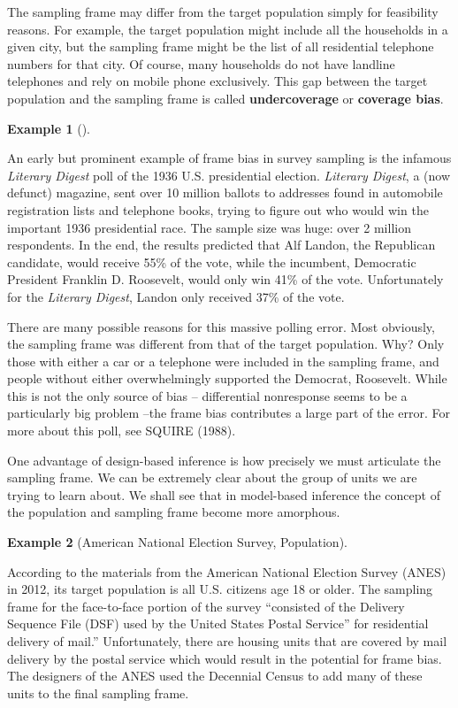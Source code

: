 \documentclass[
  letterpaper,
  DIV=11,
  numbers=noendperiod]{scrreprt}
\theoremstyle{plain}
\theoremstyle{definition}
\newtheorem{example}{Example}[chapter]
\theoremstyle{definition}
\theoremstyle{remark}
\begin{document}
The sampling frame may differ from the target population simply for
feasibility reasons. For example, the target population might include
all the households in a given city, but the sampling frame might be the
list of all residential telephone numbers for that city. Of course, many
households do not have landline telephones and rely on mobile phone
exclusively. This gap between the target population and the sampling
frame is called \textbf{undercoverage} or \textbf{coverage bias}.

\begin{example}[]\protect\hypertarget{exm-frame-bias}{}\label{exm-frame-bias}

An early but prominent example of frame bias in survey sampling is the
infamous \emph{Literary Digest} poll of the 1936 U.S. presidential
election. \emph{Literary Digest}, a (now defunct) magazine, sent over 10
million ballots to addresses found in automobile registration lists and
telephone books, trying to figure out who would win the important 1936
presidential race. The sample size was huge: over 2 million respondents.
In the end, the results predicted that Alf Landon, the Republican
candidate, would receive 55\% of the vote, while the incumbent,
Democratic President Franklin D. Roosevelt, would only win 41\% of the
vote. Unfortunately for the \emph{Literary Digest}, Landon only received
37\% of the vote.

There are many possible reasons for this massive polling error. Most
obviously, the sampling frame was different from that of the target
population. Why? Only those with either a car or a telephone were
included in the sampling frame, and people without either overwhelmingly
supported the Democrat, Roosevelt. While this is not the only source of
bias -- differential nonresponse seems to be a particularly big problem
--the frame bias contributes a large part of the error. For more about
this poll, see SQUIRE (1988).

\end{example}

One advantage of design-based inference is how precisely we must
articulate the sampling frame. We can be extremely clear about the group
of units we are trying to learn about. We shall see that in model-based
inference the concept of the population and sampling frame become more
amorphous.

\begin{example}[American National Election Survey,
Population]\protect\hypertarget{exm-anes-population}{}\label{exm-anes-population}

According to the materials from the American National Election Survey
(ANES) in 2012, its target population is all U.S. citizens age 18 or
older. The sampling frame for the face-to-face portion of the survey
``consisted of the Delivery Sequence File (DSF) used by the United
States Postal Service'' for residential delivery of mail.''
Unfortunately, there are housing units that are covered by mail delivery
by the postal service which would result in the potential for frame
bias. The designers of the ANES used the Decennial Census to add many of
these units to the final sampling frame.

\end{example}
\end{document}

